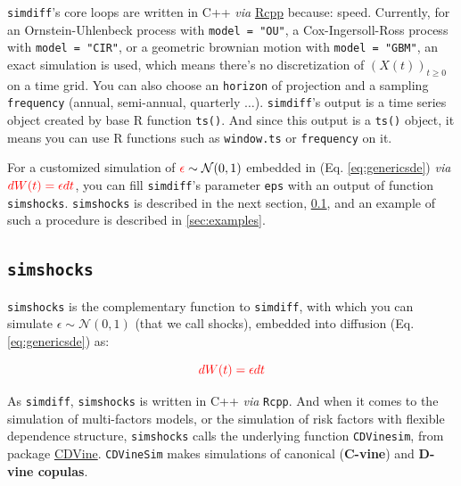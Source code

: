 \documentclass[a4paper]{article}\usepackage[]{graphicx}\usepackage[]{color}
\newcommand{\proglang}[1]{\textsf{#1}}
\newcommand{\code}[1]{\mbox{\texttt{#1}}}
\newcommand{\MN}{\mathcal{N}}
\begin{document}
\medskip

\code{simdiff}'s core loops are written in C++ \textit{via} \href{http://cran.r-project.org/web/packages/Rcpp/index.html}{Rcpp} because: speed.  Currently, for an Ornstein-Uhlenbeck process with \code{model = "OU"}, a Cox-Ingersoll-Ross process with \code{model = "CIR"}, or a geometric brownian motion with \code{model = "GBM"}, an exact simulation is used, which means there's no discretization of $(X(t))_{t \geq 0}$ on a time grid. You can also choose an \code{horizon} of projection and a sampling \code{frequency} (annual, semi-annual, quarterly $\ldots$). \code{simdiff}'s output is a time series object created by base \proglang{R} function \code{ts()}. And since this output is a \code{ts()} object, it means you can use \proglang{R} functions such as \code{window.ts} or \code{frequency} on it. 

\medskip

For a customized simulation of $\textcolor{red}{\epsilon} \sim \MN(0, 1)$ embedded in (Eq. \ref{eq:genericsde}) \textit{via} $\textcolor{red}{dW(t) = \epsilon dt}$, you can fill \code{simdiff}'s parameter \code{eps} with an output of function \code{simshocks}. \code{simshocks} is described in the next section, \ref{sec:simshocks}, and an example of such a procedure is described in \ref{sec:examples}.


\subsection{\code{simshocks}}
\label{sec:simshocks}

\code{simshocks} is the complementary function to \code{simdiff}, with which you can simulate  $\epsilon \sim \MN(0, 1)$ (that we call shocks), embedded into diffusion (Eq. \ref{eq:genericsde}) as:

\begin{equation}
\textcolor{red}{dW(t) = \epsilon dt}
\end{equation}

\medskip

As \code{simdiff}, \code{simshocks} is written in C++ \textit{via} \code{Rcpp}. And when it comes to the simulation of multi-factors models, or the simulation of risk factors with flexible dependence structure, \code{simshocks} calls the underlying function \code{CDVinesim}, from package \href{http://cran.r-project.org/web/packages/CDVine/index.html}{CDVine}. \code{CDVineSim} makes simulations of canonical ({\bf C-vine}) and {\bf D-vine copulas}. 
\end{document}
